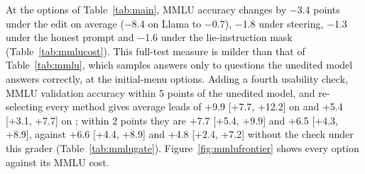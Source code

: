 At the options of Table~\ref{tab:main}, MMLU accuracy changes by $-$3.4 points under the edit on average ($-$8.4 on Llama to $-$0.7), $-$1.8 under steering, $-$1.3 under the honest prompt and $-$1.6 under the lie-instruction mask (Table~\ref{tab:mmlucost}). This full-test measure is milder than that of Table~\ref{tab:mmlu}, which samples answers only to questions the unedited model answers correctly, at the initial-menu options. Adding a fourth usability check, MMLU validation accuracy within 5 points of the unedited model, and re-selecting every method gives average leads of +9.9 [+7.7, +12.2] on \LB{} and +5.4 [+3.1, +7.7] on \AIL{}; within 2 points they are +7.7 [+5.4, +9.9] and +6.5 [+4.3, +8.9], against +6.6 [+4.4, +8.9] and +4.8 [+2.4, +7.2] without the check under this grader (Table~\ref{tab:mmlugate}). Figure~\ref{fig:mmlufrontier} shows every option against its MMLU cost.